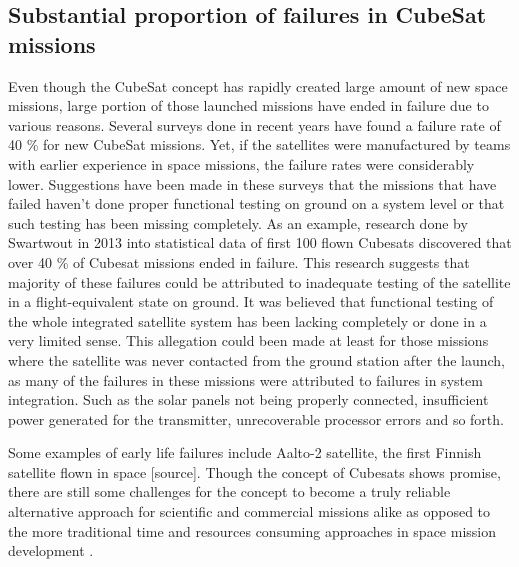 \documentclass[english,12pt,a4paper,pdftex,elec,utf8]{aaltothesis}
\begin{document}
\subsection{Substantial proportion of failures in CubeSat missions}
Even though the CubeSat concept has rapidly created large amount of new space missions, large portion of those launched missions have ended in failure due to various reasons. Several surveys done in recent years have found a failure rate of 40 \% for new CubeSat missions. Yet, if the satellites were manufactured by teams with earlier experience in space missions, the failure rates were considerably lower. Suggestions have been made in these surveys that the missions that have failed haven't done proper functional testing on ground on a system level or that such testing has been missing completely. As an example, research done by Swartwout in 2013 into statistical data of first 100 flown Cubesats discovered that over 40 \% of Cubesat missions ended in failure. This research suggests that majority of these failures could be attributed to inadequate testing of the satellite in a flight-equivalent state on ground. It was believed that functional testing of the whole integrated satellite system has been lacking completely or done in a very limited sense. This allegation could been made at least for those missions where the satellite was never contacted from the ground station after the launch, as many of the failures in these missions were attributed to failures in system integration. Such as the solar panels not being properly connected, insufficient power generated for the transmitter, unrecoverable processor errors and so forth. \cite{Swart1, Swart2016, Swart2015, Langer}\par
Some examples of early life failures include Aalto-2 satellite, the first Finnish satellite flown in space [source]. Though the concept of Cubesats shows promise, there are still some challenges for the concept to become a truly reliable alternative approach for scientific and commercial missions alike as opposed to the more traditional time and resources consuming approaches in space mission development \cite{Swart1}.\par 
\end{document}
